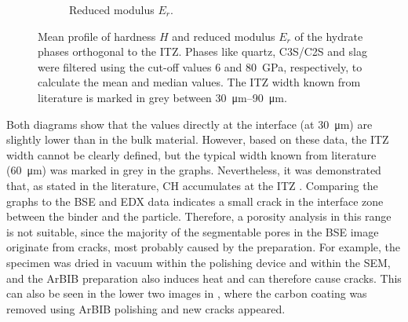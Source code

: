 \begin{figure}[htb]
\begin{subfigure}[b]{0.49\linewidth}
		\caption{Reduced modulus $E_r$.}
	\end{subfigure}
	\caption{
		Mean profile of hardness $H$ and reduced modulus $E_r$ of the hydrate phases orthogonal to the \ac{ITZ}.
		Phases like quartz, \ac{C3S}/\ac{C2S} and slag were filtered using the cut-off values \num{6} and \qty{80}{\giga\pascal}, respectively, to calculate the mean and median values.
		The \ac{ITZ} width known from literature is marked in grey between \qtyrange{30}{90}{\micro\meter}.
	}
	\label{fig:ni-profiles}
\end{figure}

Both diagrams show that the values directly at the interface (at \qty{30}{\micro\meter}) are slightly lower than in the bulk material.
However, based on these data, the \ac{ITZ} width cannot be clearly defined, but the typical width known from literature (\qty{60}{\micro\meter}) was marked in grey in the graphs.
Nevertheless, it was demonstrated that, as stated in the literature, \ac{CH} accumulates at the \ac{ITZ} \cite{li.2012, tian.2018, gao.2014}.
Comparing the graphs to the \ac{BSE} and \ac{EDX} data indicates a small crack in the interface zone between the binder and the particle.
Therefore, a porosity analysis in this range is not suitable, since the majority of the segmentable pores in the \ac{BSE} image originate from cracks, most probably caused by the preparation.
For example, the specimen was dried in vacuum within the polishing device and within the \ac{SEM}, and the \ac{ArBIB} preparation also induces heat and can therefore cause cracks.
This can also be seen in the lower two images in , where the carbon coating was removed using \ac{ArBIB} polishing and new cracks appeared.
